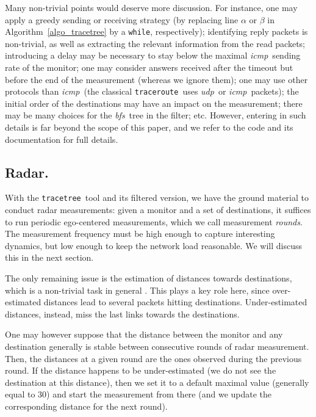 \documentclass[times, 10pt,twocolumn]{article}
\newcommand{\traceroute}{{\tt trace\-route}}
\newcommand{\tracetree}{{\tt trace\-tree}}
\newcommand{\icmp}{{\em \sc icmp}}
\newcommand{\udp}{{\em \sc udp}}
\newcommand{\bfs}{{\em \sc bfs}}
\begin{document}
Many non-trivial points would deserve more discussion. For instance,
one may apply a greedy sending or receiving strategy
(by replacing line $\alpha$ or $\beta$ in
Algorithm~\ref{algo_tracetree} by a {\tt while}, respectively);
identifying reply packets is
non-trivial, as well as extracting the relevant information from the
read packets; introducing a delay may be necessary to stay below the maximal
\icmp\ sending rate of the monitor; one may consider answers received
after the timeout but before the end of the measurement (whereas we
ignore them); one may use other protocols than \icmp\ (the classical
\traceroute\ uses \udp\ or \icmp\ packets); the initial order of the
destinations may have an impact on the measurement; there may be many
choices for the \bfs\ tree in the filter; etc.  However, entering in
such details is far beyond the scope of this paper, and we refer to
the code and its documentation \cite{radarurl} for full details.


\subsection{Radar.}
\label{sec_radar}

With the \tracetree\ tool and its filtered version, we have the ground
material to conduct radar measurements: given a monitor and a set of
destinations, it suffices to run periodic ego-centered measurements,
which we call measurement {\em rounds}.
The measurement frequency must be high enough to capture interesting
dynamics, but low enough to keep the network load reasonable. We will
discuss this 
in the next section.

The only remaining issue is the estimation of distances towards destinations, which is a non-trivial task in general \cite{streamlining}. This plays a key role here, since over-estimated distances lead to several packets hitting destinations. Under-estimated distances, instead, miss the last links towards the destinations.

One may however suppose that the distance between the monitor and any
destination generally is stable between consecutive rounds of radar
measurement.
Then,
the distances at a given round are the ones observed during the
previous round. If the distance happens to be under-estimated (we do
not see the destination at this distance), then we set it to a default
maximal value (generally equal to $30$) and start the measurement from
there (and we update the corresponding distance for the next round).
\end{document}
